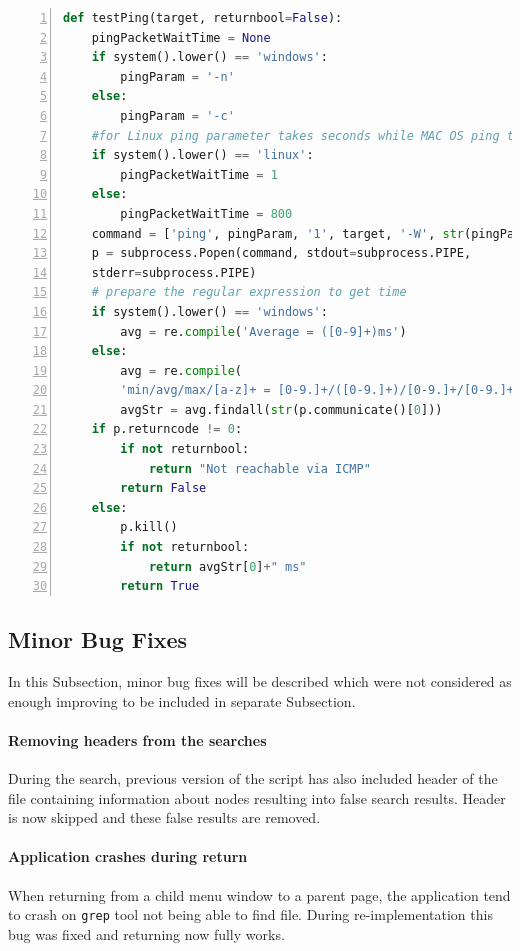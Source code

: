 {{{{{{{\noindent\begin{minipage}{\linewidth}
		\begin{lstlisting}[language=Python, numbers=left, label={lst:testping}, caption=Multi-Platform Function testPing, frame=single, showstringspaces=false, breaklines=true, keywordstyle=\color{blue},captionpos=b]
def testPing(target, returnbool=False):
	pingPacketWaitTime = None
	if system().lower() == 'windows':
		pingParam = '-n'
	else:
		pingParam = '-c'
	#for Linux ping parameter takes seconds while MAC OS ping takes miliseconds
	if system().lower() == 'linux':
		pingPacketWaitTime = 1
	else:
		pingPacketWaitTime = 800
	command = ['ping', pingParam, '1', target, '-W', str(pingPacketWaitTime)]
	p = subprocess.Popen(command, stdout=subprocess.PIPE,
	stderr=subprocess.PIPE)
	# prepare the regular expression to get time
	if system().lower() == 'windows':
		avg = re.compile('Average = ([0-9]+)ms')
	else:
		avg = re.compile(
		'min/avg/max/[a-z]+ = [0-9.]+/([0-9.]+)/[0-9.]+/[0-9.]+')
		avgStr = avg.findall(str(p.communicate()[0]))
	if p.returncode != 0:
		if not returnbool:
			return "Not reachable via ICMP"
		return False
	else:
		p.kill()
		if not returnbool:
			return avgStr[0]+" ms"
		return True
		\end{lstlisting}
	\end{minipage}

\subsection{Minor Bug Fixes}
In this Subsection, minor bug fixes will be described which were not considered as enough improving to be included in separate Subsection. 
\paragraph{Removing headers from the searches}
During the search, previous version of the script has also included header of the file containing information about nodes resulting into false search results. Header is now skipped and these false results are removed.
\paragraph{Application crashes during return}
When returning from a child menu window to a parent page, the application tend to crash on \texttt{grep} tool not being able to find file. During re-implementation this bug was fixed and returning now fully works.

}}}}}}}
